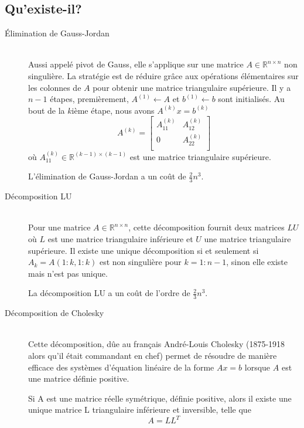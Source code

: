\subsection{Qu'existe-il?}
\begin{description}
  \item[\'Elimination de Gauss-Jordan] \hfill \\
Aussi appel\'e pivot de Gauss, elle s'applique sur une matrice $A \in \mathbb{R}^{n\times n}$ non singuli\`ere.
 La strat\'egie est de r\'eduire gr\^ace aux op\'erations \'el\'ementaires sur les colonnes de $A$ pour obtenir une matrice triangulaire sup\'erieure.
Il y a $n-1$ \'etapes, premi\`erement, $A^{(1)}\leftarrow A$ et $b^{(1)}\leftarrow b$ sont initialis\'es. Au bout
de la $k$i\`eme \'etape, nous avons $A^{(k)}x=b^{(k)}$ %
$$A^{(k)}= \left[
\begin{array}{rl}
 A^{(k)}_{11} & A^{(k)}_{12} \\
 0       & A^{(k)}_{22} \\
\end{array}\right]$$
o\`u $A^{(k)}_{11} \in \mathbb{R}^{(k-1)\times(k-1)}$ est une matrice triangulaire sup\'erieure.

L'\'elimination de Gauss-Jordan a un coût de $\frac{2}{3}n^3$.


  \item[D\'ecomposition LU] \hfill \\
Pour une matrice $A\in \mathbb{R}^{n\times n}$, cette d\'ecomposition fournit deux matrices $LU$ o\`u
$L$ est une matrice triangulaire inf\'erieure et $U$ une matrice triangulaire sup\'erieure. Il existe une unique d\'ecomposition si
et seulement si $A_k=A(1:k,1:k)$ est non singuli\`ere pour $k=1:n-1$, sinon elle existe mais n'est pas unique.

La d\'ecomposition LU a un coût de l'ordre de $\frac{2}{3}n^3$.


  \item[D\'ecomposition de Cholesky] \hfill \\


Cette d\'ecomposition, dûe au fran\c{c}ais Andr\'e-Louis Cholesky (1875-1918 alors qu'il \'etait commandant en chef) permet de r\'esoudre de mani\`ere efficace des syst\`emes
 d'\'equation lin\'eaire de la forme $Ax=b$ lorsque $A$ est une matrice d\'efinie positive.

\begin{frtheoreme}
 Si A est une matrice r\'eelle sym\'etrique,  d\'efinie positive, alors il existe une unique matrice L
triangulaire inf\'erieure et inversible, telle que
 $$A = LL^T$$
\end{frtheoreme}




\end{description}
